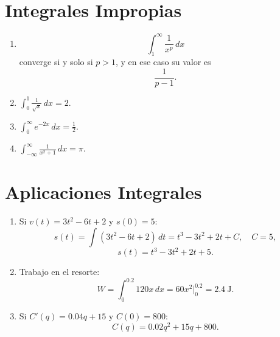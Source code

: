 \documentclass[12pt,a4paper]{article}
\begin{document}
\section{Integrales Impropias}
\begin{enumerate}
    \item
    $$\int_1^{\infty} \frac{1}{x^p}\,dx$$
    converge si y solo si $p>1$, y en ese caso su valor es
    $$\frac{1}{p-1}.$$

    \item $\int_0^1 \frac{1}{\sqrt{x}}\,dx = 2$.

    \item $\int_0^{\infty} e^{-2x}\,dx = \frac{1}{2}$.

    \item $\int_{-\infty}^{\infty} \frac{1}{x^2+1}\,dx = \pi$.
\end{enumerate}

\section{Aplicaciones Integrales}
\begin{enumerate}
    \item Si $v(t)=3t^2-6t+2$ y $s(0)=5$:
    $$s(t)=\int (3t^2-6t+2)\,dt=t^3-3t^2+2t+C, \quad C=5,$$
    $$s(t)=t^3-3t^2+2t+5.$$

    \item Trabajo en el resorte:
    $$W=\int_0^{0.2}120x\,dx=60x^2\Big|_0^{0.2}=2.4\ \text{J}.$$

    \item Si $C'(q)=0.04q+15$ y $C(0)=800$:
    $$C(q)=0.02q^2+15q+800.$$
\end{enumerate}
\end{document}

